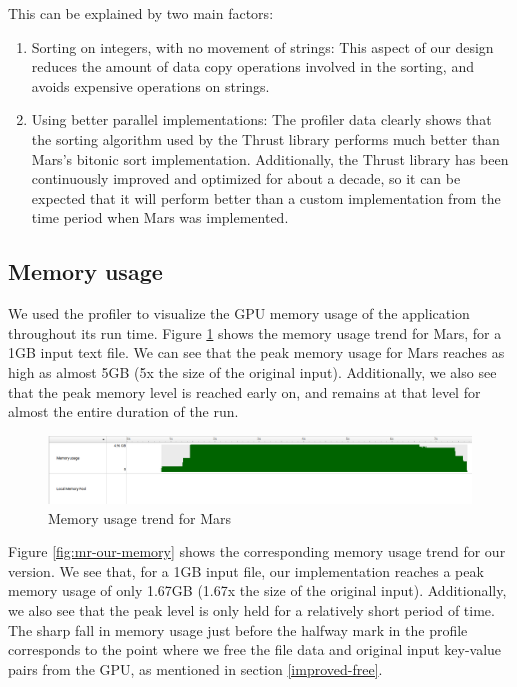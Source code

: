 \documentclass{article}
\begin{document}
This can be explained by two main factors:
\begin{enumerate}
    \item Sorting on integers, with no movement of strings: This aspect of our design reduces the amount of data copy operations involved in the sorting, and avoids expensive operations on strings.
    \item Using better parallel implementations: The profiler data clearly shows that the sorting algorithm used by the Thrust library performs much better than Mars's bitonic sort implementation. Additionally, the Thrust library has been continuously improved and optimized for about a decade, so it can be expected that it will perform better than a custom implementation from the time period when Mars was implemented.
\end{enumerate}

\subsection{Memory usage}
We used the profiler to visualize the GPU memory usage of the application throughout its run time. Figure \ref{fig:mr-mars-memory} shows the memory usage trend for Mars, for a 1GB input text file. We can see that the peak memory usage for Mars reaches as high as almost 5GB (5x the size of the original input). Additionally, we also see that the peak memory level is reached early on, and remains at that level for almost the entire duration of the run.

\begin{figure}
    \centering
    \includegraphics[width=1\linewidth]{images/mr-mars-memory.png}
    \caption{Memory usage trend for Mars}
    \label{fig:mr-mars-memory}
\end{figure}

Figure \ref{fig:mr-our-memory} shows the corresponding memory usage trend for our version. We see that, for a 1GB input file, our implementation reaches a peak memory usage of only 1.67GB (1.67x the size of the original input). Additionally, we also see that the peak level is only held for a relatively short period of time. The sharp fall in memory usage just before the halfway mark in the profile corresponds to the point where we free the file data and original input key-value pairs from the GPU, as mentioned in section \ref{improved-free}.
\end{document}
